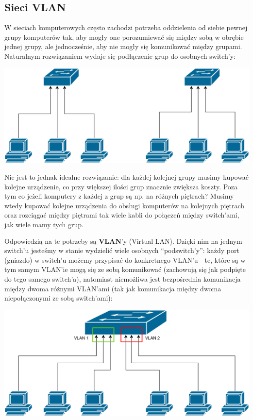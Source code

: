 \documentclass[12pt]{article}
\begin{document}
    \subsection{Sieci VLAN}
    W sieciach komputerowych często zachodzi potrzeba oddzielenia od siebie pewnej grupy komputerów tak, aby mogły one porozumiewać się między sobą w obrębie jednej grupy,
    ale jednocześnie, aby nie mogły się komunikować między grupami.
    Naturalnym rozwiązaniem wydaje się podłączenie grup do osobnych switch'y:

    \bigskip
    \includegraphics[width=\linewidth]{vlan/two_independent_switches.png}
    \smallskip

    \noindent Nie jest to jednak idealne rozwiązanie: dla każdej kolejnej grupy musimy kupować kolejne urządzenie, co przy większej ilości grup znacznie zwiększa koszty.
    Poza tym co jeżeli komputery z każdej z grup są np. na różnych piętrach? Musimy wtedy kupować kolejne urządzenia do obsługi komputerów na kolejnych piętrach oraz
    rozciągać między piętrami tak wiele kabli do połączeń między switch'ami, jak wiele mamy tych grup.

    Odpowiedzią na te potrzeby są \textbf{VLAN}'y (Virtual LAN). Dzięki nim na jednym switch'u jesteśmy w stanie wydzielić wiele osobnych ``podswitch'y'':
    każdy port (gniazdo) w switch'u możemy przypisać do konkretnego VLAN'u - te, które są w tym samym VLAN'ie mogą się ze sobą komunikować (zachowują się jak podpięte
    do tego samego switch'a), natomiast niemożliwa jest bezpośrednia komunikacja między dwoma różnymi VLAN'ami (tak jak komunikacja między dwoma niepołączonymi ze sobą switch'ami):

    \bigskip
    \includegraphics[width=\linewidth]{vlan/one_switch_two_vlans.png}
    \smallskip
\end{document}
